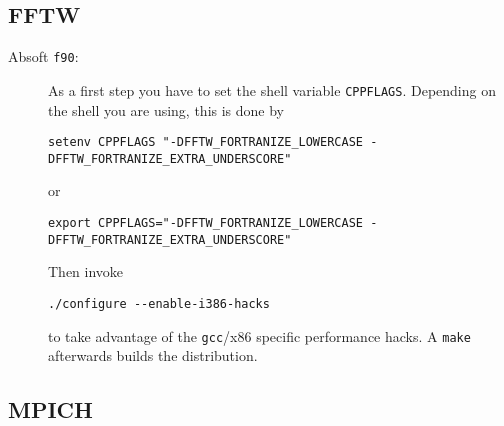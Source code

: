 \documentclass[a4paper,10pt]{article}
\begin{document}
\subsection{FFTW}

\begin{description}
\item[Absoft \texttt{f90}:] As a first step you have to set the shell variable
\texttt{CPPFLAGS}. Depending on the shell you are using, this is done by
{\footnotesize
\begin{verbatim}
setenv CPPFLAGS "-DFFTW_FORTRANIZE_LOWERCASE -DFFTW_FORTRANIZE_EXTRA_UNDERSCORE"
\end{verbatim}
}
or
{\footnotesize
\begin{verbatim}
export CPPFLAGS="-DFFTW_FORTRANIZE_LOWERCASE -DFFTW_FORTRANIZE_EXTRA_UNDERSCORE"
\end{verbatim}
}
Then invoke
\begin{verbatim}
./configure --enable-i386-hacks
\end{verbatim}
to take advantage of the \texttt{gcc}/x86 specific performance hacks. A \texttt{make} afterwards builds the distribution.


\end{description}

\subsection{MPICH}
\end{document}
